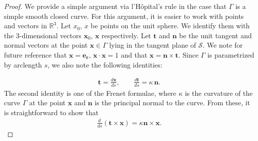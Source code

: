 \begin{proof}

We provide a simple argument via l'H\^{o}pital's rule in the case that
$\Gamma$ is a simple smooth closed curve. For this argument, it is
easier  to work with points and vectors in $\mathbb{R}^3$.  Let $x_0$,
$x$ be points on the unit sphere. We identify them with the
3-dimensional vectors $\mathbf{x}_{0}$, $\mathbf{x}$ respectively.  Let
$\mathbf{t}$ and $\mathbf{n}$ be the unit tangent and normal vectors
at the point $\mathbf{x} \in \Gamma$ lying in the tangent plane of
$\mathcal{S}$.  We note for future reference that
$\mathbf{x}=\mathbf{e_r}$, $\mathbf{x} \cdot \mathbf{x} = 1$ and that
$\mathbf{x} = \mathbf{n} \times \mathbf{t}$. Since $\Gamma$ is
parametrized by arclength $s$, we also note the following identities:

\begin{align*}
  \mathbf{t} = \frac{d\mathbf{x}}{ds}, \qquad 
  \frac{d\mathbf{t}}{ds} = \kappa \, \mathbf{n}.
\end{align*}
The second identity is one of the Frenet formulae, where $\kappa$ is the
curvature of the curve $\Gamma$ at the point $\mathbf{x}$ and
$\mathbf{n}$ is the principal normal to the curve.  From these, it is
straightforward to show that 
\begin{align*}
  \frac{d \, }{ds} \left( \mathbf{t} \times \mathbf{x} \right)=
  \kappa \mathbf{n} \times \mathbf{x} . 
\end{align*}


\end{proof}
